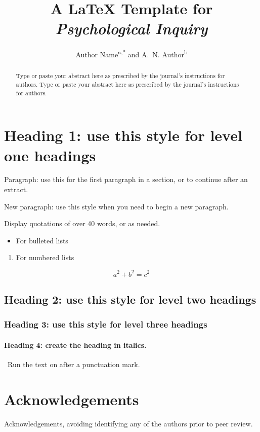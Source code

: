 \documentclass{tandf}
\title{A \LaTeX{} Template for \textit{Psychological Inquiry}}
\author{Author Name\textsuperscript{a,*} and A.~N. Author\textsuperscript{b}}
\affiliation{\textsuperscript{a}Department, University, City, Country; \textsuperscript{b}Department, University, City, Country}
\begin{document}
\maketitle
\begin{abstract}
Type or paste your abstract here as prescribed by the journal's instructions for authors. Type or paste your abstract here as prescribed by the journal's instructions for authors.
\end{abstract}
\section{Heading 1: use this style for level one headings}
Paragraph: use this for the first paragraph in a section, or to continue after an extract.

New paragraph: use this style when you need to begin a new paragraph.

Display quotations of over 40 words, or as needed.
\begin{itemize}
  \item For bulleted lists
\end{itemize}
\begin{enumerate}
  \item For numbered lists
\end{enumerate}
\begin{equation}
  a^2 + b^2 = c^2
\end{equation}
\subsection{Heading 2: use this style for level two headings}
\subsubsection{Heading 3: use this style for level three headings}
\paragraph{Heading 4: create the heading in italics.}\ Run the text on after a punctuation mark.
\section{Acknowledgements}
Acknowledgements, avoiding identifying any of the authors prior to peer review.

\nocite{example2026}

\end{document}
